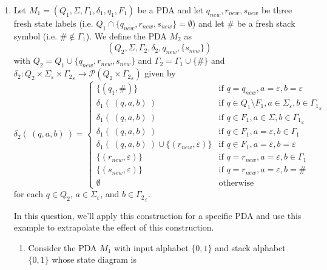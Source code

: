 \begin{enumerate}[wide, labelwidth=!, labelindent=0pt]
\begin{enumerate}
\item Let $M_1 = (Q_1, \Sigma, \Gamma_1, \delta_1, q_1, F_1)$ 
be a PDA and let $q_{new}, r_{new}, s_{new}$ be three fresh state labels 
(i.e. $Q_1 \cap \{q_{new}, r_{new}, s_{new}\} = \emptyset$) 
and let $\#$ be a fresh stack symbol (i.e. $\# \notin \Gamma_1$).
We define the PDA $M_2$ as
\[
   (Q_2, \Sigma, \Gamma_2, \delta_2, q_{new}, \{s_{new}\})
\]
with $Q_2 = Q_1 \cup \{q_{new}, r_{new}, s_{new}\}$ 
and $\Gamma_2 = \Gamma_1 \cup \{\#\}$
and 
$\delta_2 : Q_2 \times \Sigma_\varepsilon \times {\Gamma_2}_\varepsilon \to 
\mathcal{P}(Q_2 \times {\Gamma_2}_\varepsilon)$ given by 
\[
\delta_2 ( ~(q,a,b)~) = 
\begin{cases}
\{(q_1, \#)\} &\text{if } q = q_{new}, a = \varepsilon, b = \varepsilon\\
\delta_1( ~(q,a,b)~) &\text{if } q\in Q_1 \setminus F_1, a \in \Sigma_{\varepsilon}, b \in {\Gamma_1}_\varepsilon \\
\delta_1( ~(q,a,b)~) &\text{if } q\in F_1, a \in \Sigma, b \in {\Gamma_1}_\varepsilon \\
\delta_1( ~(q,a,b)~) &\text{if } q\in F_1, a =\varepsilon, b \in {\Gamma_1} \\
\delta_1( ~(q,a,b)~) \cup \{(r_{new}, \varepsilon)\} &\text{if } q\in F_1, a =\varepsilon, b =\varepsilon \\
\{(r_{new}, \varepsilon)\} &\text{if } q = r_{new}, a =\varepsilon, b \in \Gamma_{1} \\
\{(s_{new}, \varepsilon)\} &\text{if } q= r_{new}, a = \varepsilon, b = \#\\
\emptyset & \text{otherwise}
\end{cases}
\]
for each $q \in Q_2$, $a \in \Sigma_{\varepsilon}$, 
and $b \in {\Gamma_2}_\varepsilon$.

In this question, we'll apply this construction for a specific PDA and 
use this example to extrapolate the effect of this construction.
\begin{enumerate}

\item\gradeCorrect Consider the PDA $M_1$ with input alphabet $\{0,1\}$ 
and stack alphabet $\{0,1\}$ whose state diagram is

\begin{center}

\end{center}
\end{enumerate}
\end{enumerate}
\end{enumerate}

